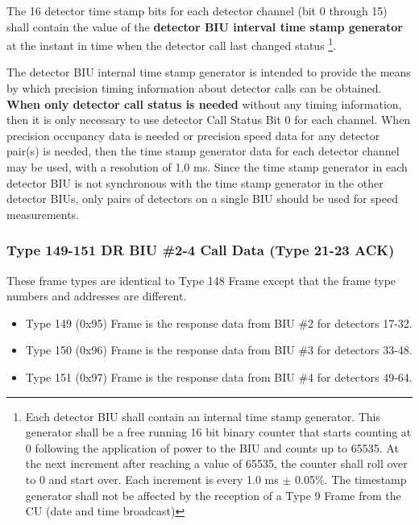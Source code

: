 \documentclass[]{article}
\begin{document}
The 16 detector time stamp bits for each detector channel (bit 0 through 15) shall contain the value of the \textbf{detector BIU interval time stamp generator} at the instant in time when the detector call last changed status \footnote{Each detector BIU shall contain an internal time stamp generator. This generator shall be a free running 16 bit binary counter that starts counting at 0 following the application of power to the BIU and counts up to 65535. At the next increment after reaching a value of 65535, the counter shall roll over to 0 and start over. Each increment is every 1.0 ms $\pm$ 0.05$\%$. The timestamp generator shall not be affected by the reception of a Type 9 Frame from the CU (date and time broadcast)}. 

The detector BIU internal time stamp generator is intended to provide the means by which precision timing information about detector calls can be obtained.\textbf{ When only detector call status is needed} without any timing information, then it is only necessary to use detector Call Status Bit 0 for each channel. When precision occupancy data is needed or precision speed data for any detector pair(s) is needed, then the time stamp generator data for each detector channel may be used, with a resolution of 1.0 ms. Since the time stamp generator in each detector BIU is not synchronous with the time stamp generator in the other detector BIUs, only pairs of detectors on a single BIU should be used for speed measurements.

\clearpage

\subsubsection {Type 149-151 DR BIU \#2-4 Call Data (Type 21-23 ACK)}
These frame types are identical to Type 148 Frame except that the frame type numbers and addresses are different. 

\begin{itemize}
	\item Type 149 (0x95) Frame is the response data from BIU \#2 for detectors 17-32.
	\item Type 150 (0x96) Frame is the response data from BIU \#3 for detectors 33-48.
	\item Type 151 (0x97) Frame is the response data from BIU \#4 for detectors 49-64.
\end{itemize}
\end{document}
